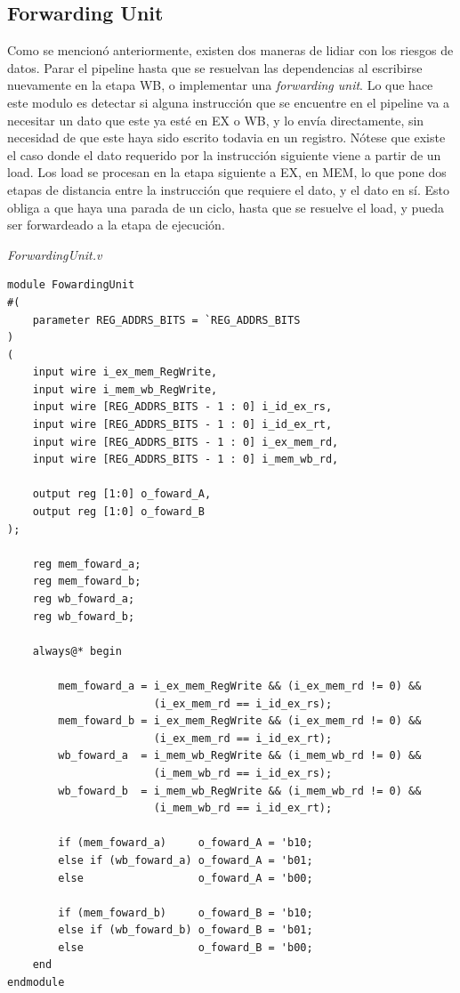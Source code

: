 \documentclass[12pt]{article}
\begin{document}
\subsection{Forwarding Unit}

Como se mencionó anteriormente, existen dos maneras de lidiar con los riesgos de datos. Parar el pipeline hasta que se resuelvan las dependencias al escribirse nuevamente en la etapa WB, o implementar una \textit{forwarding unit}. Lo que hace este modulo es detectar si alguna instrucción que se encuentre en el pipeline va a necesitar un dato que este ya esté en EX o WB, y lo envía directamente, sin necesidad de que este haya sido escrito todavia en un registro. Nótese que existe el caso donde el dato requerido por la instrucción siguiente viene a partir de un load. Los load se procesan en la etapa siguiente a EX, en MEM, lo que pone dos etapas de distancia entre la instrucción que requiere el dato, y el dato en sí. Esto obliga a que haya una parada de un ciclo, hasta que se resuelve el load, y pueda ser forwardeado a la etapa de ejecución.

\noindent \textit{ForwardingUnit.v}
\begin{lstlisting}
module FowardingUnit
#(
    parameter REG_ADDRS_BITS = `REG_ADDRS_BITS
)
(
    input wire i_ex_mem_RegWrite,
    input wire i_mem_wb_RegWrite,
    input wire [REG_ADDRS_BITS - 1 : 0] i_id_ex_rs,
    input wire [REG_ADDRS_BITS - 1 : 0] i_id_ex_rt,
    input wire [REG_ADDRS_BITS - 1 : 0] i_ex_mem_rd,
    input wire [REG_ADDRS_BITS - 1 : 0] i_mem_wb_rd,

    output reg [1:0] o_foward_A,
    output reg [1:0] o_foward_B
);

    reg mem_foward_a;
    reg mem_foward_b;
    reg wb_foward_a;
    reg wb_foward_b;

    always@* begin

        mem_foward_a = i_ex_mem_RegWrite && (i_ex_mem_rd != 0) &&
                       (i_ex_mem_rd == i_id_ex_rs);
        mem_foward_b = i_ex_mem_RegWrite && (i_ex_mem_rd != 0) &&
                       (i_ex_mem_rd == i_id_ex_rt);
        wb_foward_a  = i_mem_wb_RegWrite && (i_mem_wb_rd != 0) &&
                       (i_mem_wb_rd == i_id_ex_rs);
        wb_foward_b  = i_mem_wb_RegWrite && (i_mem_wb_rd != 0) &&
                       (i_mem_wb_rd == i_id_ex_rt);

        if (mem_foward_a)     o_foward_A = 'b10;
        else if (wb_foward_a) o_foward_A = 'b01;
        else                  o_foward_A = 'b00;

        if (mem_foward_b)     o_foward_B = 'b10;
        else if (wb_foward_b) o_foward_B = 'b01;
        else                  o_foward_B = 'b00;
    end
endmodule
\end{lstlisting}
\end{document}
